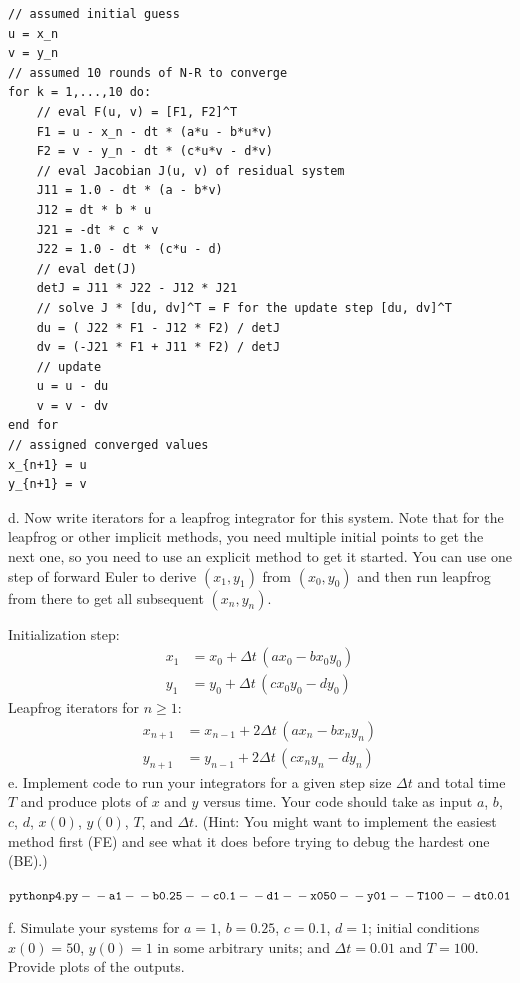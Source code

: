 \documentclass[11pt]{article}
\begin{document}
{\color{red}
\begin{lstlisting}[style=code,basicstyle=\ttfamily\small\color{red},commentstyle=\color{red}\itshape]
// assumed initial guess
u = x_n
v = y_n
// assumed 10 rounds of N-R to converge
for k = 1,...,10 do:
    // eval F(u, v) = [F1, F2]^T
    F1 = u - x_n - dt * (a*u - b*u*v)
    F2 = v - y_n - dt * (c*u*v - d*v)
    // eval Jacobian J(u, v) of residual system
    J11 = 1.0 - dt * (a - b*v)
    J12 = dt * b * u
    J21 = -dt * c * v
    J22 = 1.0 - dt * (c*u - d)
    // eval det(J)
    detJ = J11 * J22 - J12 * J21
    // solve J * [du, dv]^T = F for the update step [du, dv]^T
    du = ( J22 * F1 - J12 * F2) / detJ
    dv = (-J21 * F1 + J11 * F2) / detJ
    // update
    u = u - du
    v = v - dv
end for
// assigned converged values
x_{n+1} = u
y_{n+1} = v
\end{lstlisting}
}

d. Now write iterators for a leapfrog integrator for this system.  Note that for the leapfrog or other implicit methods, you need multiple initial points to get the next one, so you need to use an explicit method to get it started.  You can use one step of forward Euler to derive $(x_1,y_1)$ from $(x_0,y_0)$ and then run leapfrog from there to get all subsequent $(x_n,y_n)$. 

{\color{red}
Initialization step:
\begin{align*}
x_1 &= x_0 + \Delta t\,(a x_0 - b x_0 y_0)\\
y_1 &= y_0 + \Delta t\,(c x_0 y_0 - d y_0)
\end{align*}
Leapfrog iterators for $n \ge 1$:
\begin{align*}
x_{n+1} &= x_{n-1} + 2\Delta t\,(a x_n - b x_n y_n)\\
y_{n+1} &= y_{n-1} + 2\Delta t\,(c x_n y_n - d y_n)
\end{align*}
}
e. Implement code to run your integrators for a given step size $\Delta t$ and total time $T$ and produce plots of $x$ and $y$ versus time.  Your code should take as input $a$, $b$, $c$, $d$, $x(0)$, $y(0)$, $T$, and $\Delta t$.  (Hint: You might want to implement the easiest method first (FE) and see what it does before trying to debug the hardest one (BE).)

\textcolor{red}{
$\tt python p4.py -{}-a 1 -{}-b 0.25 -{}-c 0.1 -{}-d 1 -{}-x0 50 -{}-y0 1 -{}-T 100 -{}-dt 0.01$
}

f. Simulate your systems for $a=1$, $b=0.25$, $c=0.1$, $d=1$; initial conditions $x(0)=50$, $y(0)=1$ in some arbitrary units; and $\Delta t=0.01$ and $T=100$.  Provide plots of the outputs.
\end{document}
